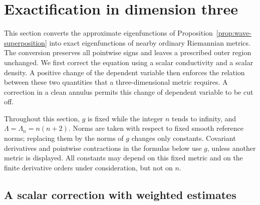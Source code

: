 \section{Exactification in dimension three}
\label{sec:exactification}

This section converts the approximate eigenfunctions of
Proposition~\ref{prop:wave-superposition} into exact eigenfunctions of nearby
ordinary Riemannian metrics.  The conversion preserves all pointwise signs
and leaves a prescribed outer region unchanged.  We first correct the
equation using a scalar conductivity and a scalar density.  A positive
change of the dependent variable then enforces the relation between these
two quantities that a three-dimensional metric requires.  A correction in
a clean annulus permits this change of dependent variable to be cut off.

Throughout this section, \(g\) is fixed while the integer \(n\) tends to
infinity, and \(\Lambda=\Lambda_n=n(n+2)\).  Norms are taken with respect to
fixed smooth reference norms; replacing them by the norms of \(g\) changes
only constants.  Covariant derivatives and pointwise contractions in the
formulas below use \(g\), unless another metric is displayed.  All constants
may depend on this fixed metric and on the finite derivative orders under
consideration, but not on \(n\).

\subsection{A scalar correction with weighted estimates}

